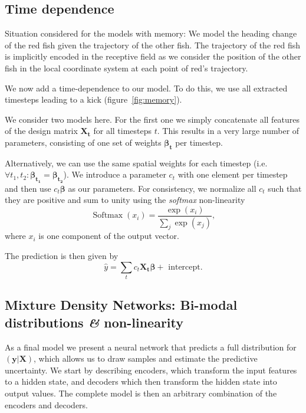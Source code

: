 \documentclass[nobib, a4paper]{tufte-handout}
\begin{document}
\subsection{Time dependence}
\begin{marginfigure}[2cm]
 \caption{Situation considered for the models with memory:
   We model the heading change of the red fish given the trajectory of the other fish.
 The trajectory of the red fish is implicitly encoded in the receptive field as we consider the position of the other fish in the local coordinate system at each point of red's trajectory.}
\label{fig:memory}
\end{marginfigure}
We now add a time-dependence to our model.
To do this, we use all extracted timesteps leading to a kick (figure~\ref{fig:memory}).

We consider two models here.
For the first one we simply concatenate all features of the design matrix \(\bm{X_t}\) for all timesteps \(t\).
This results in a very large number of parameters, consisting of one set of weights \(\bm{\beta_t}\) per timestep.

Alternatively, we can use the same spatial weights for each timestep (i.e.\ \( \forall t_1, t_2: \bm{\beta_{t_1}} = \bm{\beta_{t_2}}\)).
We introduce a parameter \(c_t\) with one element per timestep and then use $c_t \bm{\beta}$ as our parameters.
For consistency, we normalize all \(c_t\) such that they are positive and sum to unity using the \textit{softmax} non-linearity
\begin{equation}\label{eq:softmax}
\operatorname{Softmax} (x_i) = \frac{\exp (x_i)}{\sum_j \exp (x_j)},
\end{equation}
where \(x_i\) is one component of the output vector.

The prediction is then given by
\begin{equation*}
  \hat{y} = \sum_t c_t \bm{X_t} \bm{\beta} + \text{ intercept}.
\end{equation*}

\subsection{Mixture Density Networks: Bi-modal distributions \textit{\&} non-linearity}
As a final model we present a neural network that predicts a full distribution for \(\left( \bm{y} | \bm{X}\right)\), which allows us to draw samples and estimate the predictive uncertainty.
We start by describing encoders, which transform the input features to a hidden state, and decoders which then transform the hidden state into output values.
The complete model is then an arbitrary combination of the encoders and decoders.
\end{document}
